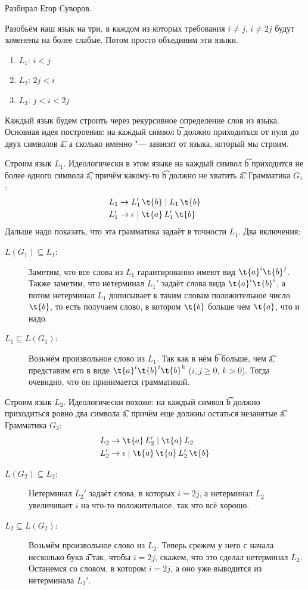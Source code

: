 	Разбирал Егор Суворов.

	Разобьём наш язык на три, в каждом из которых требования $i \neq j$, $i \neq 2j$ будут заменены на более слабые.
	Потом просто объединим эти языки.
	\begin{enumerate}
		\item $L_1$: $i < j$
		\item $L_2$: $2j < i$
		\item $L_3$: $j < i < 2j$
	\end{enumerate}
	Каждый язык будем строить через рекурсивное определение слов из языка.
	Основная идея построения: на каждый символ \t{b} должно приходиться от нуля до двух символов \t{a},
	а сколько именно "--- зависит от языка, который мы строим.

	Строим язык $L_1$.
	Идеологически в этом языке на каждый символ \t{b} приходится не более одного символа \t{a},
	причём какому-то \t{b} должно не хватить \t{a}.
	Грамматика $G_1$:
	\begin{align*}
		L_1 &\to L_1'\, \t{b} \mid L_1 \, \t{b} \\
		L_1' &\to \epsilon \mid \t{a}\,L_1'\,\t{b}
	\end{align*}
	Дальше надо показать, что эта грамматика задаёт в точности $L_1$.
	Два включения:
	\begin{description}
		\item[$L(G_1) \subseteq L_1$:]
			Заметим, что все слова из $L_1$ гарантированно имеют вид $\t{a}^i\t{b}^j$.
			Также заметим, что нетерминал $L_1'$ задаёт слова вида $\t{a}^i\t{b}^i$, а потом
			нетерминал $L_1$ дописывает к таким словам положительное число $\t{b}$, то
			есть получаем слово, в котором $\t{b}$ больше чем $\t{a}$, что и надо.
		\item[$L_1 \subseteq L(G_1)$:]
			Возьмём произвольное слово из $L_1$.
			Так как в нём \t{b} больше, чем \t{a}, представим его в виде $\t{a}^i\t{b}^i\t{b}^k$ ($i, j \ge 0$, $k > 0$).
			Тогда очевидно, что он принимается грамматикой.
	\end{description}

	Строим язык $L_2$.
	Идеологически похоже: на каждый символ \t{b} должно приходиться ровно два символа \t{a},
	причём еще должны остаться незанятые \t{a}.
	Грамматика $G_2$:
	\begin{align*}
		L_2 &\to \t{a}\,L_2' \mid \t{a}\,L_2 \\
		L_2' &\to \epsilon \mid \t{a}\,\t{a}\,L_2'\,\t{b}
	\end{align*}
	\begin{description}
		\item[$L(G_2) \subseteq L_2$:]
			Нетерминал $L_2'$ задаёт слова, в которых $i = 2j$, а нетерминал $L_2$
			увеличивает $i$ на что-то положительное, так что всё хорошо.
		\item[$L_2 \subseteq L(G_2)$:]
			Возьмём произвольное слово из $L_2$.
			Теперь срежем у него с начала несколько букв \t{a} так, чтобы $i=2j$, скажем, что это сделал нетерминал $L_2$.
			Останемся со словом, в котором $i=2j$, а оно уже выводится из нетерминала $L_2'$.
	\end{description}

